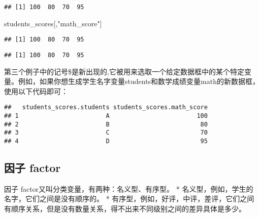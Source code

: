 \documentclass[]{book}
\newenvironment{Shaded}{\begin{snugshade}}{\end{snugshade}}
\newcommand{\KeywordTok}[1]{\textcolor[rgb]{0.13,0.29,0.53}{\textbf{#1}}}
\newcommand{\NormalTok}[1]{#1}
\newcommand{\OperatorTok}[1]{\textcolor[rgb]{0.81,0.36,0.00}{\textbf{#1}}}
\newcommand{\StringTok}[1]{\textcolor[rgb]{0.31,0.60,0.02}{#1}}
\begin{document}
\begin{verbatim}
## [1] 100  80  70  95
\end{verbatim}

\begin{Shaded}
\begin{Highlighting}[]
\NormalTok{students_scores[,}\StringTok{"math_score"}\NormalTok{]}
\end{Highlighting}
\end{Shaded}

\begin{verbatim}
## [1] 100  80  70  95
\end{verbatim}

\begin{Shaded}
\end{Shaded}

\begin{verbatim}
## [1] 100  80  70  95
\end{verbatim}

第三个例子中的记号\$是新出现的,它被用来选取一个给定数据框中的某个特定变量。例如，如果你想生成学生名字变量students和数学成绩变量math的新数据框，使用以下代码即可：

\begin{Shaded}
\end{Shaded}

\begin{verbatim}
##   students_scores.students students_scores.math_score
## 1                        A                        100
## 2                        B                         80
## 3                        C                         70
## 4                        D                         95
\end{verbatim}

\hypertarget{-factor}{%
\subsection{因子 factor}\label{-factor}}

因子 factor又叫分类变量，有两种：名义型、有序型。 *
名义型，例如，学生的名字，它们之间是没有顺序的。 *
有序型，例如，好评，中评，差评，它们之间有顺序关系，但是没有数量关系，得不出来不同级别之间的差异具体是多少。
\end{document}
